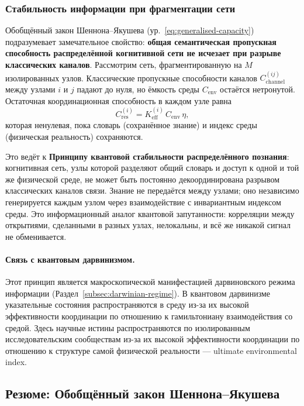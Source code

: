 \documentclass[12pt,a4paper]{article}
\theoremstyle{remark}
\begin{document}
	\subsubsection{Стабильность информации при фрагментации сети}
	\label{subsubsec:info-stability-fragmentation}
	
	Обобщённый закон Шеннона–Якушева (ур.~\ref{eq:generalised-capacity}) подразумевает замечательное свойство: \textbf{общая семантическая пропускная способность распределённой когнитивной сети не исчезает при разрыве классических каналов}. Рассмотрим сеть, фрагментированную на \(M\) изолированных узлов. Классические пропускные способности каналов \(C_{\mathrm{channel}}^{(ij)}\) между узлами \(i\) и \(j\) падают до нуля, но ёмкость среды \(C_{\mathrm{env}}\) остаётся нетронутой. Остаточная координационная способность в каждом узле равна
	\[
	C_{\mathrm{res}}^{(i)} = K_{\mathrm{eff}}^{(i)} \, C_{\mathrm{env}} \, \eta,
	\]
	которая ненулевая, пока словарь (сохранённое знание) и индекс среды (физическая реальность) сохраняются.
	
	Это ведёт к \textbf{Принципу квантовой стабильности распределённого познания}: когнитивная сеть, узлы которой разделяют общий словарь и доступ к одной и той же физической среде, не может быть постоянно декоординирована разрывом классических каналов связи. Знание не передаётся между узлами; оно независимо генерируется каждым узлом через взаимодействие с инвариантным индексом среды. Это информационный аналог квантовой запутанности: корреляции между открытиями, сделанными в разных узлах, нелокальны, и всё же никакой сигнал не обменивается.
	
	\paragraph{Связь с квантовым дарвинизмом.}
	Этот принцип является макроскопической манифестацией дарвиновского режима информации (Раздел~\ref{subsec:darwinian-regime}). В квантовом дарвинизме указательные состояния распространяются в среду из-за их высокой эффективности координации по отношению к гамильтониану взаимодействия со средой. Здесь научные истины распространяются по изолированным исследовательским сообществам из-за их высокой эффективности координации по отношению к структуре самой физической реальности — ultimate environmental index.
	
	\subsection{Резюме: Обобщённый закон Шеннона–Якушева}
	\label{subsec:generalised-law}
	
\end{document}

